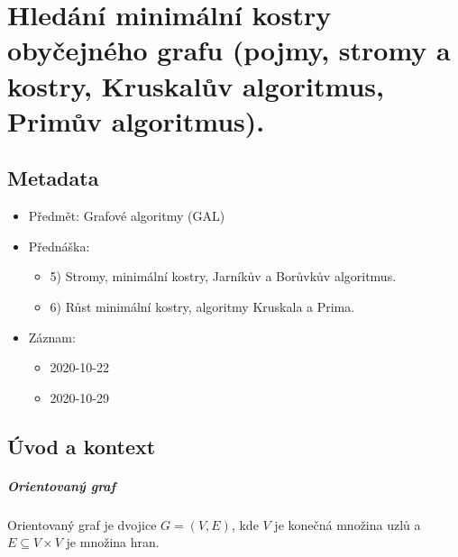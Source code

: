 


\chapter{Hledání minimální kostry obyčejného grafu (pojmy, stromy a kostry, Kruskalův algoritmus, Primův algoritmus).}


\section{Metadata}

\begin{itemize}
    \item Předmět: Grafové algoritmy (GAL)
    \item Přednáška:
    \begin{itemize}
        \item 5) Stromy, minimální kostry, Jarníkův a Borůvkův algoritmus.
        \item 6) Růst minimální kostry, algoritmy Kruskala a Prima.
    \end{itemize}
    \item Záznam:
    \begin{itemize}
        \item 2020-10-22
        \item 2020-10-29
    \end{itemize}
\end{itemize}


\section{Úvod a kontext}

\paragraph*{Orientovaný graf} Orientovaný graf je dvojice $G = (V, E)$, kde $V$ je konečná množina uzlů a $E \subseteq V \times V$ je množina hran.

